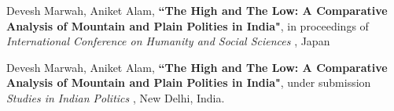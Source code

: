\begin{enumerate}[label={[P\arabic*]}]  
    \item Devesh Marwah, Aniket Alam, \textbf{``The High and The Low: A Comparative Analysis of Mountain and Plain Polities in India"}, in proceedings of {\it International Conference on Humanity and Social Sciences }, Japan
    
    \item Devesh Marwah, Aniket Alam, \textbf{``The High and The Low: A Comparative Analysis of Mountain and Plain Polities in India"}, under submission {\it Studies in Indian Politics }, New Delhi, India.
    
\end{enumerate}
